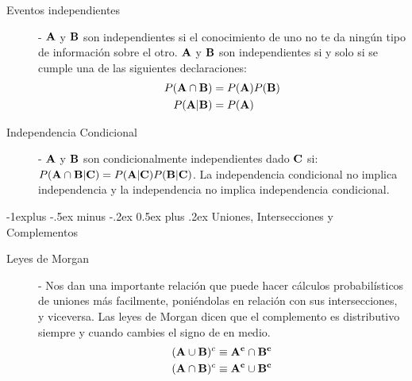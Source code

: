 \documentclass[10pt,landscape]{article}
\makeatletter
\renewcommand{\subsection}{\@startsection{subsection}{2}{0mm}%
                                {-1explus -.5ex minus -.2ex}%
                                {0.5ex plus .2ex}%
                                {\normalfont\normalsize\bfseries}}
\makeatother
\begin{document}
\begin{multicols}{3}
    \begin{description}
        \item[Eventos independientes] - ${\bf A}$ y ${\bf B}$ son independientes si el conocimiento de uno no te da ningún tipo de información sobre el otro. ${\bf A}$ y ${\bf B}$ son independientes si y solo si se cumple una de las siguientes declaraciones: 
           \begin{align*} 
            P({\bf A}\cap {\bf B}) &= P({\bf A})P({\bf B}) \\
            P({\bf A}|{\bf B}) &= P({\bf A})
           \end{align*}
        \item[Independencia Condicional] - ${\bf A}$ y ${\bf B}$ son condicionalmente independientes dado ${\bf C}$ si: $P({\bf A}\cap {\bf B}|{\bf C}) = P({\bf A}|{\bf C})P({\bf B}|{\bf C})$. La independencia condicional no implica independencia y la independencia no implica independencia condicional. 
    \end{description}
    
\subsection{Uniones, Intersecciones y Complementos}

    \begin{description}

        \item[Leyes de Morgan] - Nos dan una importante relación que puede hacer cálculos probabilísticos de uniones más facilmente, poniéndolas en relación con sus intersecciones, y viceversa. Las leyes de Morgan dicen que el complemento es distributivo siempre y cuando cambies el signo de en medio.
           \begin{align*} 
        ({\bf A} \cup {\bf B})^c \equiv {\bf A^c} \cap {\bf B^c} \\
        ({\bf A} \cap {\bf B})^c \equiv {\bf A^c} \cup {\bf B^c}
           \end{align*} 
                  


\end{description}
\end{multicols}
\end{document}
